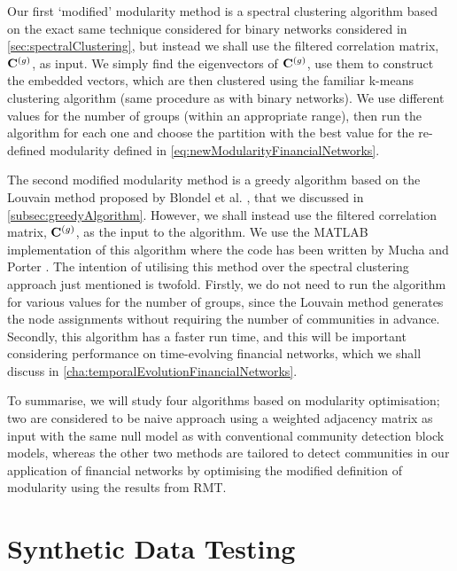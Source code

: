 Our first `modified' modularity method is a spectral clustering algorithm based on the exact same technique considered for binary networks considered in \cref{sec:spectralClustering}, but instead we shall use the filtered correlation matrix, $\mathbf C^{(g)}$, as input.
We simply find the eigenvectors of $\mathbf C^{(g)}$, use them to construct the embedded vectors, which are then clustered using the familiar k-means clustering algorithm (same procedure as with binary networks).
We use different values for the number of groups (within an appropriate range), then run the algorithm for each one and choose the partition with the best value for the re-defined modularity defined in \cref{eq:newModularityFinancialNetworks}.

The second modified modularity method is a greedy algorithm based on the Louvain method proposed by Blondel et al. \cite{BGL+08}, that we discussed in \cref{subsec:greedyAlgorithm}.
However, we shall instead use the filtered correlation matrix, $\mathbf C^{(g)}$, as the input to the algorithm.
We use the MATLAB implementation of this algorithm where the code has been written by Mucha and Porter \cite{GenLou}.
The intention of utilising this method over the spectral clustering approach just mentioned is twofold.
Firstly, we do not need to run the algorithm for various values for the number of groups, since the Louvain method generates the node assignments without requiring the number of communities in advance.
Secondly, this algorithm has a faster run time, and this will be important considering performance on time-evolving financial networks, which we shall discuss in \cref{cha:temporalEvolutionFinancialNetworks}.

To summarise, we will study four algorithms based on modularity optimisation; two are considered to be naive approach using a weighted adjacency matrix as input with the same null model as with conventional community detection block models, whereas the other two methods are tailored to detect communities in our application of financial networks by optimising the modified definition of modularity using the results from RMT.


\section{Synthetic Data Testing}
\label{sec:syntheticDataTesting}


